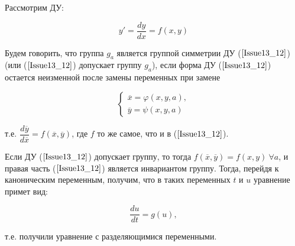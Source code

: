 Рассмотрим ДУ: 

\begin{equation}
 	y' = \dfrac{dy}{dx} = f(x,y)
 	\label{Issue13_12}
\end{equation}

Будем говорить, что группа $g_a$ является $\textbf{группой симметрии}$ ДУ ($\ref{Issue13_12}$) (или ($\ref{Issue13_12}$) допускает группу $g_a$), если форма ДУ ($\ref{Issue13_12}$) остается неизменной после замены переменных при замене 

\begin{equation}
	\begin{cases}
	\overline{x} = \varphi(x,y,a), \\
	\overline{y} = \psi(x,y,a)
	\end{cases}
\end{equation}

т.е. $\dfrac{d\overline{y}}{d\overline{x}} = f(\overline{x}, \overline{y})$, где $f$ то же самое, что и в ($\ref{Issue13_12}$).

Если ДУ ($\ref{Issue13_12}$) допускает группу, то тогда $f(\overline{x}, \overline{y}) = f(x,y)\ \forall a$, и правая часть ($\ref{Issue13_12}$) является инвариантом группу. Тогда, перейдя к каноническим переменным, получим, что в таких переменных $t$ и $u$ уравнение примет вид:

\begin{equation}
	\dfrac{du}{dt} = g(u),
	\label{Issue13_13}
\end{equation}

т.е. получили уравнение с разделяющимися переменными.
























 
